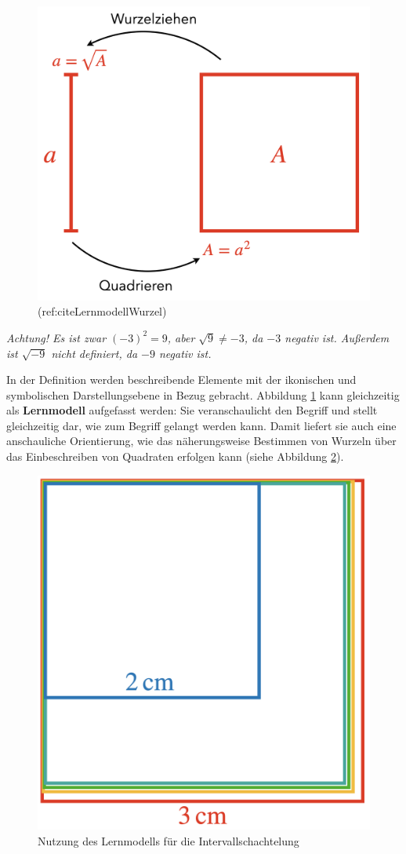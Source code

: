 \documentclass[
  ngerman,
]{scrbook}
\theoremstyle{definition}
\theoremstyle{definition}
\theoremstyle{definition}
\theoremstyle{definition}
\theoremstyle{remark}
\begin{document}
\begin{enumerate}
\begin{figure}
   {\centering \includegraphics[width=0.5\linewidth]{pictures/8-Lernmodell} 

   }

   \caption{(ref:citeLernmodellWurzel)}\label{fig:LernmodellWurzel}
   \end{figure}

  \emph{Achtung! Es ist zwar \((-3)^2 = 9\), aber \(\sqrt{9} \neq -3\), da \(-3\) negativ ist. Außerdem ist \(\sqrt{-9}\) nicht definiert, da \(-9\) negativ ist.}

  In der Definition werden beschreibende Elemente mit der ikonischen und symbolischen Darstellungsebene in Bezug gebracht. Abbildung \ref{fig:LernmodellWurzel} kann gleichzeitig als \textbf{Lernmodell} aufgefasst werden: Sie veranschaulicht den Begriff und stellt gleichzeitig dar, wie zum Begriff gelangt werden kann. Damit liefert sie auch eine anschauliche Orientierung, wie das näherungsweise Bestimmen von Wurzeln über das Einbeschreiben von Quadraten erfolgen kann (siehe Abbildung \ref{fig:IntervallWurzel}).

  \begin{figure}

   {\centering \includegraphics[width=0.25\linewidth]{pictures/8-Intervall} 

   }

   \caption{Nutzung des Lernmodells für die Intervallschachtelung}\label{fig:IntervallWurzel}
   \end{figure}


\end{enumerate}
\end{document}
